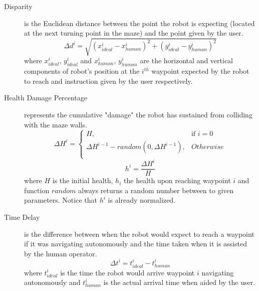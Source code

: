 \documentclass{sig-alternate}
\begin{document}
\begin{description}
  \item[Disparity] is the Euclidean distance between the point the
    robot is expecting (located at the next turning point in the maze)
    and the point given by the user.
  \begin{equation}
  \label{eq:disparity}
  \Delta d^i=\sqrt{(x_{ideal}^i-x_{human}^i)^2+(y_{ideal}^i-y_{human}^i)^2}
  \end{equation}
  where $x_{ideal}^i$, $y_{ideal}^i$ and $x_{human}^i$, $y_{human}^i$ are the horizontal and vertical
  components of robot's position at the $i^{th}$ waypoint expected by the robot to reach and instruction given by the user respectively.

  \item[Health Damage Percentage] represents the cumulative "damage"
    the robot has sustained from colliding with the maze walls.
\begin{equation}
  \label{eq:health_calc} 
\Delta H^i = 
\begin{cases}
H, & \text{if } i = 0\\
\Delta H^{i-1}-random(0,\Delta H^{i-1}), & Otherwise\\
\end{cases}
\end{equation}
\begin{equation}
\label{eq:health_calc_norm}
h^i = \dfrac{\Delta H^i}{H}
\end{equation}
  where $H$ is the initial health, $h_i$ the health upon reaching waypoint $i$ and function $random$ always returns a random number between to given parameters. Notice that $h^i$ is already normalized.
 
  \item[Time Delay] is the difference between when the robot would
    expect to reach a waypoint if it was navigating autonomously
    and the time taken when it is assisted by the human operator.
  \begin{equation}
  \label{eq:time_delay}
  \Delta t^i =t_{ideal}^i-t_{human}^i
  \end{equation}
  where $t_{ideal}^i$ is the time the robot would arrive waypoint $i$  navigating autonomously and $t_{human}^i$ is the actual arrival time when aided by the user.
\end{description}
\end{document}
